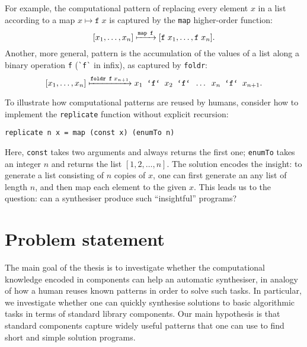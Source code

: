 For example, the computational pattern of replacing every element $x$ in a list according to a map $x \mapsto \texttt{f} \; x$ is captured by the \lstinline!map! higher-order function:
\[ [x_1, \dots, x_n] \xmapsto{\texttt{map f}} [\texttt{f} \; x_1, \dots, \texttt{f} \; x_n]. \]
Another, more general, pattern is the accumulation of the values of a list along a binary operation \lstinline!f! (\lstinline!`f`! in infix), as captured by \lstinline!foldr!:
\[ [x_1, \dots, x_n] \xmapsto{\texttt{foldr f} \; x_{n+1}} x_1 \texttt{ `f` } x_2 \texttt{ `f` } \dots \texttt{ } x_n \texttt{ `f` } x_{n+1}. \] 


To illustrate how computational patterns are reused by humans, consider how to implement the \lstinline!replicate! function without explicit recursion:
\begin{lstlisting}[style=plain]
replicate n x = map (const x) (enumTo n)
\end{lstlisting}
Here, \lstinline!const! takes two arguments and always returns the first one; \lstinline!enumTo! takes an integer $n$ and returns the list $[1, 2, \ldots, n]$.  The solution encodes the insight: to generate a list consisting of $n$ copies of $x$, one can first generate an any list of length $n$, and then map each element to the given $x$.  This leads us to the question: can a synthesiser produce such ``insightful'' programs?

\section{Problem statement}

The main goal of the thesis is to investigate whether the computational knowledge encoded in components can help an automatic synthesiser, in analogy of how a human reuses known patterns in order to solve such tasks.  In particular, we investigate whether one can quickly synthesise solutions to basic algorithmic tasks in terms of standard library components.  Our main hypothesis is that standard components capture widely useful patterns that one can use to find short and simple solution programs.

